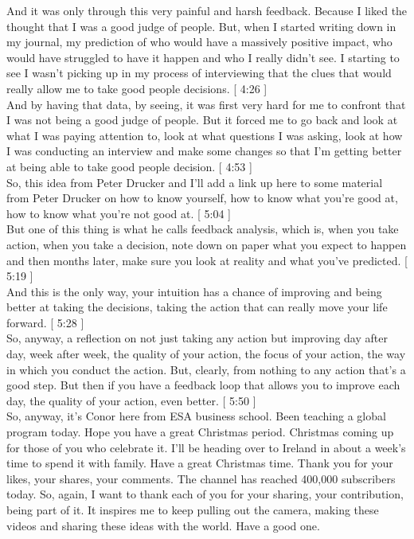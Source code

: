 \documentclass[a4paper,12pt]{article}
\begin{document}
And it was only through this very painful and harsh feedback. Because I liked the thought that I was a good judge of people. But, when I started writing down in my journal, my prediction of who would have a massively positive impact, who would have struggled to have it happen and who I really didn't see. I starting to see I wasn't picking up in my process of interviewing that the clues that would really allow me to take good people decisions. [ 4:26 ] \\

And by having that data, by seeing, it was first very hard for me to confront that I was not being a good judge of people. But it forced me to go back and look at what I was paying attention to, look at what questions I was asking, look at how I was conducting an interview and make some changes so that I'm getting better at being able to take good people decision. [ 4:53 ] \\

So, this idea from Peter Drucker and I'll add a link up here to some material from Peter Drucker on how to know yourself, how to know what you're good at, how to know what you're not good at. [ 5:04 ] \\

But one of this thing is what he calls feedback analysis, which is, when you take action, when you take a decision, note down on paper what you expect to happen and then months later, make sure you look at reality and what you've predicted. [ 5:19 ] \\

And this is the only way, your intuition has a chance of improving and being better at taking the decisions, taking the action that can really move your life forward. [ 5:28 ] \\

So, anyway, a reflection on not just taking any action but improving day after day, week after week, the quality of your action, the focus of your action, the way in which you conduct the action. But, clearly, from nothing to any action that's a good step. But then if you have a feedback loop that allows you to improve each day, the quality of your action, even better. [ 5:50 ] \\

So, anyway, it's Conor here from ESA business school. Been teaching a global program today. Hope you have a great Christmas period. Christmas coming up for those of you who celebrate it. I'll be heading over to Ireland in about a week's time to spend it with family. Have a great Christmas time. Thank you for your likes, your shares, your comments. The channel has reached 400,000 subscribers today. So, again, I want to thank each of you for your sharing, your contribution, being part of it. It inspires me to keep pulling out the camera, making these videos and sharing these ideas with the world. Have a good one. \\
\end{document}
